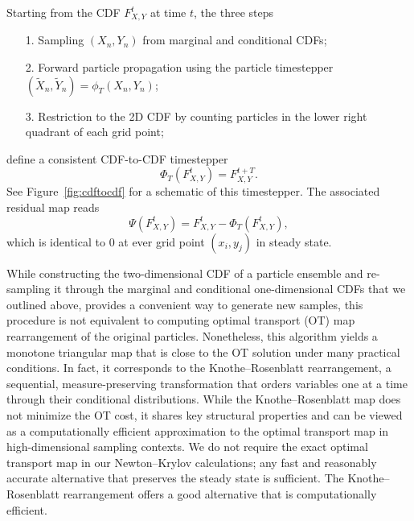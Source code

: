 \documentclass{article}
\begin{document}
Starting from the CDF $F_{X,Y}^t$ at time $t$, the three steps 
\begin{itemize}
\item[1.] Sampling $(X_n,Y_n)$ from marginal and conditional CDFs; 
\item[2.] Forward particle propagation using the particle timestepper $(\tilde{X}_n, \tilde{Y}_n) = \phi_T(X_n, Y_n)$;
\item[3.] Restriction to the 2D CDF by counting particles in the lower right quadrant of each grid point;
\end{itemize}
define a consistent CDF-to-CDF timestepper
\begin{equation}
    \Phi_T\left(F_{X,Y}^t\right) = F_{X,Y}^{t+T}.
\end{equation}
See Figure~\ref{fig:cdftocdf} for a schematic of this timestepper. The associated residual map reads
\begin{equation} \label{eq:2dcdf_psi}
\Psi\left(F_{X,Y}^t\right) = F_{X,Y}^t - \Phi_T(F_{X,Y}^t),
\end{equation}
which is identical to $0$ at ever grid point $(x_i,y_j)$ in steady state. 

While constructing the two-dimensional CDF of a particle ensemble and re-sampling it through the marginal and conditional one-dimensional CDFs that we outlined above, provides a convenient way to generate new samples, this procedure is not equivalent to computing optimal transport (OT) map rearrangement of the original particles. Nonetheless, this algorithm yields a monotone triangular map that is close to the OT solution under many practical conditions. In fact, it corresponds to the Knothe–Rosenblatt rearrangement, a sequential, measure-preserving transformation that orders variables one at a time through their conditional distributions. While the Knothe–Rosenblatt map does not minimize the OT cost, it shares key structural properties and can be viewed as a computationally efficient approximation to the optimal transport map in high-dimensional sampling contexts. We do not require the exact optimal transport map in our Newton–Krylov calculations; any fast and reasonably accurate alternative that preserves the steady state is sufficient. The Knothe–Rosenblatt rearrangement offers a good alternative that is computationally efficient.
\end{document}
